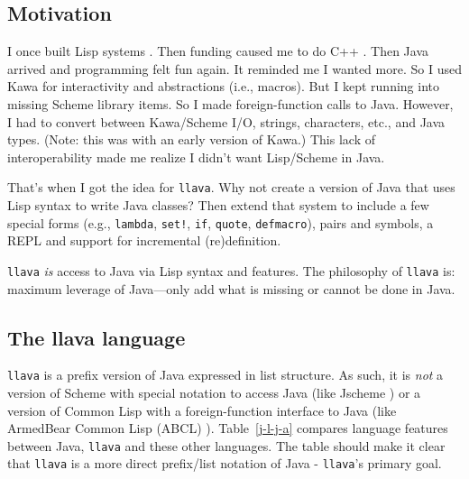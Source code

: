 \documentclass{acm_proc_article-sp}
\begin{document}
\subsection{Motivation}

I once built Lisp systems \cite{LaSC5,LaSC3}.  Then funding caused me
to do C++ \cite{DC++}.  Then Java arrived and programming felt fun
again.  It reminded me I wanted more.  So I used Kawa \cite{kawa} for
interactivity and abstractions (i.e., macros).  But I kept running
into missing Scheme library items.  So I made foreign-function calls
to Java.  However, I had to convert between Kawa/Scheme I/O, strings,
characters, etc., and Java types.  (Note: this was with an early
version of Kawa.)  This lack of interoperability made me realize I
didn't want Lisp/Scheme in Java.

That's when I got the idea for {\tt llava}.  Why not create a version
of Java that uses Lisp syntax to write Java classes?  Then extend that
system to include a few special forms (e.g., {\tt lambda}, {\tt set!},
{\tt if}, {\tt quote}, {\tt defmacro}), pairs and symbols, a REPL
and support for incremental (re)definition.

{\tt llava} \emph{is} access to Java via Lisp syntax and features.
The philosophy of {\tt llava} is: maximum leverage of Java---only add
what is missing or cannot be done in Java.

\subsection{The llava language}
\label{the-llava-language}

{\tt llava} is a prefix version of Java expressed in list structure.
As such, it is \emph{not} a version of Scheme with special notation to
access Java (like Jscheme \cite{JschemeDot}) or a version of Common Lisp
with a foreign-function interface to Java (like ArmedBear Common Lisp
(ABCL) \cite{abcl}).  Table~\ref{j-l-j-a} compares language features
between Java, {\tt llava} and these other languages.  The table should
make it clear that {\tt llava} is a more direct prefix/list notation
of Java - {\tt llava}'s primary goal.
\end{document}
